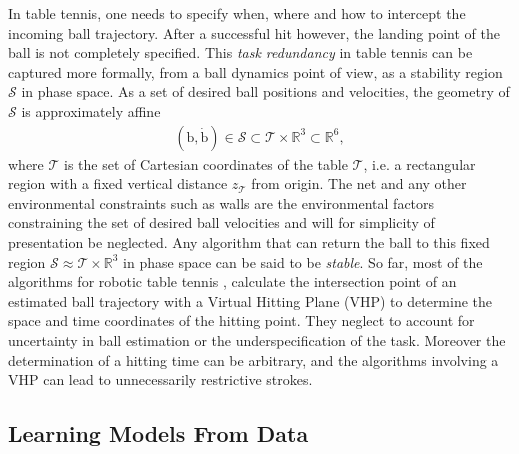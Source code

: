\documentclass[letterpaper, 10 pt, conference]{ieeeconf}
\newcommand{\boldvec}[1]{\boldsymbol{\mathrm{#1}}}
\let\vec\boldvec
\newcommand{\ball}{\vec{b}} %
\newcommand{\stabilityRegion}{\mathcal{S}} %
\newcommand{\court}{\mathcal{T}} %
\begin{document}
In table tennis, one needs to specify when, where and how to intercept the incoming ball trajectory. After a successful hit however, the landing point of the ball is not completely specified. This \emph{task redundancy} in table tennis can be captured more formally, from a ball dynamics point of view, as a stability region $\stabilityRegion$ in phase space. As a set of desired ball positions and velocities, the geometry of $\stabilityRegion$ is approximately affine
%
\begin{align}
(\ball,\dot{\ball}) \in \stabilityRegion \subset \court \times \mathbb{R}^{3} \subset \mathbb{R}^{6},
\label{stabilityRegion}
\end{align}
%
\noindent where $\court$ is the set of Cartesian coordinates of the table $\court$, i.e. a rectangular region with a fixed vertical distance $z_{\court}$ from origin. The net and any other environmental constraints such as walls are the environmental factors constraining the set of desired ball velocities and will for simplicity of presentation be neglected. Any algorithm that can return the ball to this fixed region $\stabilityRegion \approx \court \times \mathbb{R}^3$ in phase space can be said to be \emph{stable}.
%
So far, most of the algorithms for robotic table tennis \cite{Matsushima05}, \cite{Muelling13} calculate the intersection point of an estimated ball trajectory with a Virtual Hitting Plane (VHP) to determine the space and time coordinates of the hitting point. They neglect to account for uncertainty in ball estimation or the underspecification of the task. Moreover the determination of a hitting time can be arbitrary, and the algorithms involving a VHP can lead to unnecessarily restrictive strokes. 



\subsection{Learning Models From Data}
\end{document}
